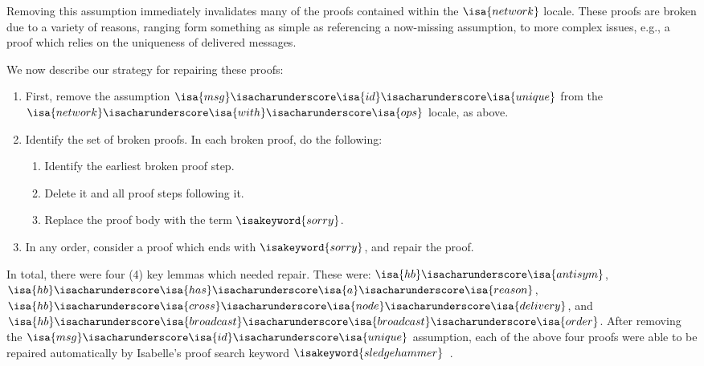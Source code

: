 Removing this assumption immediately invalidates many of the proofs contained
within the $\isa{network}$ locale. These proofs are broken due to a variety of
reasons, ranging form something as simple as referencing a now-missing
assumption, to more complex issues, e.g., a proof which relies on the uniqueness
of delivered messages.

We now describe our strategy for repairing these proofs:
\begin{enumerate}
  \item First, remove the assumption
    $\isa{msg}\isacharunderscore\isa{id}\isacharunderscore\isa{unique}$ from the
    $\isa{network}\isacharunderscore\isa{with}\isacharunderscore\isa{ops}$
    locale, as above.
  \item Identify the set of broken proofs. In each broken proof, do the
    following:
    \begin{enumerate}
      \item Identify the earliest broken proof step.
      \item Delete it and all proof steps following it.
      \item Replace the proof body with the term $\isakeyword{sorry}$.
    \end{enumerate}
  \item In any order, consider a proof which ends with $\isakeyword{sorry}$, and
    repair the proof.
\end{enumerate}

In total, there were four (4) key lemmas which needed repair. These were:
$\isa{hb}\isacharunderscore\isa{antisym}$,
$\isa{hb}\isacharunderscore\isa{has}\isacharunderscore\isa{a}\isacharunderscore\isa{reason}$,
$\isa{hb}\isacharunderscore\isa{cross}\isacharunderscore\isa{node}\isacharunderscore\isa{delivery}$, and
$\isa{hb}\isacharunderscore\isa{broadcast}\isacharunderscore\isa{broadcast}\isacharunderscore\isa{order}$.
After removing the
$\isa{msg}\isacharunderscore\isa{id}\isacharunderscore\isa{unique}$ assumption,
each of the above four proofs were able to be repaired automatically by
Isabelle's proof search keyword $\isakeyword{sledgehammer}$~\citep{wenzel02}.

